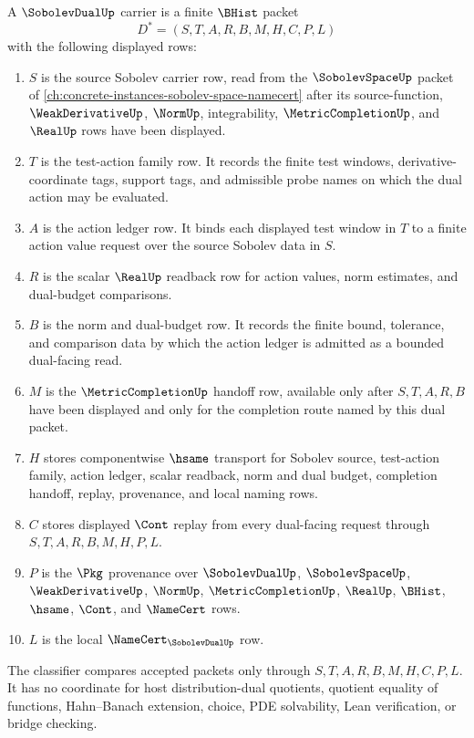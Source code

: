 \begin{definition}
\label{def:sobolev-dual-carrier}
A $\SobolevDualUp$ carrier is a finite $\BHist$ packet
$$
D^\ast=(S,T,A,R,B,M,H,C,P,L)
$$
with the following displayed rows:
\begin{enumerate}
\item $S$ is the source Sobolev carrier row, read from the $\SobolevSpaceUp$ packet of \autoref{ch:concrete-instances-sobolev-space-namecert} after its source-function, $\WeakDerivativeUp$, $\NormUp$, integrability, $\MetricCompletionUp$, and $\RealUp$ rows have been displayed.
\item $T$ is the test-action family row. It records the finite test windows, derivative-coordinate tags, support tags, and admissible probe names on which the dual action may be evaluated.
\item $A$ is the action ledger row. It binds each displayed test window in $T$ to a finite action value request over the source Sobolev data in $S$.
\item $R$ is the scalar $\RealUp$ readback row for action values, norm estimates, and dual-budget comparisons.
\item $B$ is the norm and dual-budget row. It records the finite bound, tolerance, and comparison data by which the action ledger is admitted as a bounded dual-facing read.
\item $M$ is the $\MetricCompletionUp$ handoff row, available only after $S,T,A,R,B$ have been displayed and only for the completion route named by this dual packet.
\item $H$ stores componentwise $\hsame$ transport for Sobolev source, test-action family, action ledger, scalar readback, norm and dual budget, completion handoff, replay, provenance, and local naming rows.
\item $C$ stores displayed $\Cont$ replay from every dual-facing request through $S,T,A,R,B,M,H,P,L$.
\item $P$ is the $\Pkg$ provenance over $\SobolevDualUp$, $\SobolevSpaceUp$, $\WeakDerivativeUp$, $\NormUp$, $\MetricCompletionUp$, $\RealUp$, $\BHist$, $\hsame$, $\Cont$, and $\NameCert$ rows.
\item $L$ is the local $\NameCert_{\SobolevDualUp}$ row.
\end{enumerate}
The classifier compares accepted packets only through $S,T,A,R,B,M,H,C,P,L$. It has no coordinate for host distribution-dual quotients, quotient equality of functions, Hahn--Banach extension, choice, PDE solvability, Lean verification, or bridge checking.
\end{definition}

